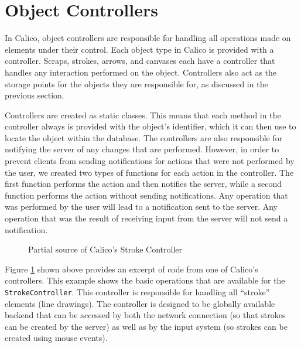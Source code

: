 \section{Object Controllers}
In Calico, object controllers are responsible for handling all operations made on elements under their control. Each object type in Calico is provided with a controller.
Scraps, strokes, arrows, and canvases each have a controller that handles any interaction performed on the object. 
Controllers also act as the storage points for the objects they are responsible for, as discussed in the previous section.

Controllers are created as static classes. This means that each method in the controller always is provided with the object's identifier, which it can then use to locate the object within the database. 
The controllers are also responsible for notifying the server of any changes that are performed. However, in order to prevent clients from sending notifications for actions that were not performed by the user, we created two types of functions for each action in the controller. The first function performs the action and then notifies the server, while a second function performs the action without sending notifications. Any operation that was performed by the user will lead to a notification sent to the server. Any operation that was the result of receiving input from the server will not send a notification.

\begin{figure}[htb]
  \centering
  \small
  
  \normalsize
  \caption{Partial source of Calico's Stroke Controller}
  \label{code:controller}
\end{figure}

Figure \ref{code:controller} shown above provides an excerpt of code from one of Calico's controllers. This example shows the basic operations that are available for the \texttt{StrokeController}. This controller is responsible for handling all ``stroke'' elements (line drawings). The controller is designed to be globally available backend that can be accessed by both the network connection (so that strokes can be created by the server) as well as by the input system (so strokes can be created using mouse events). 

